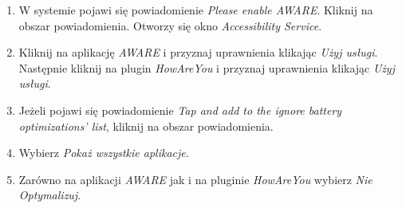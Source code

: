 \begin{enumerate}
	\item W systemie pojawi się powiadomienie \textit{Please enable AWARE}. Kliknij na obszar powiadomienia. Otworzy się okno \textit{Accessibility Service}.
	
	\item Kliknij na aplikację \textit{AWARE} i przyznaj uprawnienia klikając \textit{Użyj usługi}. Następnie kliknij na plugin \textit{HowAreYou} i przyznaj uprawnienia klikając \textit{Użyj usługi}.
	
	\item Jeżeli pojawi się powiadomienie \textit{Tap and add to the ignore battery optimizations' list}, kliknij na obszar powiadomienia.
	
	\item Wybierz \textit{Pokaż wszystkie aplikacje}.
	
	\item Zarówno na aplikacji \textit{AWARE} jak i na pluginie \textit{HowAreYou} wybierz \textit{Nie Optymalizuj}.
	

\end{enumerate}
